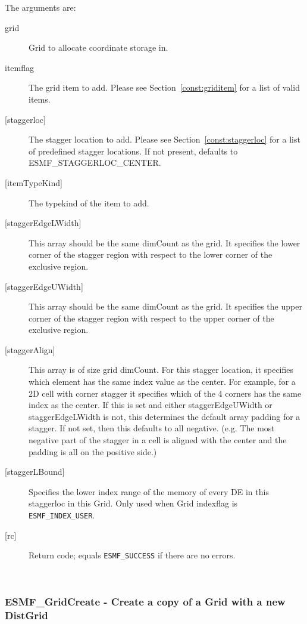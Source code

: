    The arguments are:
   \begin{description}
       \item[grid]
         Grid to allocate coordinate storage in.
   \item[itemflag]
        The grid item to add. Please see Section~\ref{const:griditem} for a list of valid items.
   \item[{[staggerloc]}]
        The stagger location to add. Please see Section~\ref{const:staggerloc} for a list
        of predefined stagger locations. If not present, defaults to ESMF\_STAGGERLOC\_CENTER.
   \item[{[itemTypeKind]}]
        The typekind of the  item to add.
   \item[{[staggerEdgeLWidth]}]
        This array should be the same dimCount as the grid. It specifies the lower corner of the stagger
        region with respect to the lower corner of the exclusive region.
   \item[{[staggerEdgeUWidth]}]
        This array should be the same dimCount as the grid. It specifies the upper corner of the stagger
        region with respect to the upper corner of the exclusive region.
   \item[{[staggerAlign]}]
        This array is of size  grid dimCount.
        For this stagger location, it specifies which element
        has the same index value as the center. For example,
        for a 2D cell with corner stagger it specifies which
        of the 4 corners has the same index as the center.
        If this is set and either staggerEdgeUWidth or staggerEdgeLWidth is not,
        this determines the default array padding for a stagger.
        If not set, then this defaults to all negative. (e.g.
        The most negative part of the stagger in a cell is aligned with the
        center and the padding is all on the positive side.)
   \item[{[staggerLBound]}]
        Specifies the lower index range of the memory of every DE in this staggerloc in this Grid.
        Only used when Grid indexflag is {\tt ESMF\_INDEX\_USER}.
   \item[{[rc]}]
        Return code; equals {\tt ESMF\_SUCCESS} if there are no errors.
   \end{description}
   
 
\mbox{}\hrulefill\ 
 
\subsubsection [ESMF\_GridCreate] {ESMF\_GridCreate - Create a copy of a Grid with a new DistGrid}


